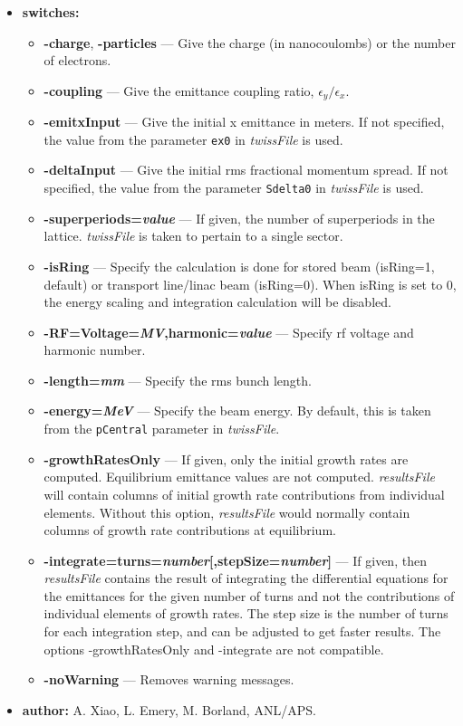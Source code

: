 \documentclass[11pt]{article}
\begin{document}
\begin{itemize}
\item {\bf switches:}
\begin{itemize}
\item {\bf -charge}, {\bf -particles} --- Give the charge (in nanocoulombs) or the
 number of electrons.
\item {\bf -coupling} --- Give the emittance coupling ratio, $\epsilon_y/\epsilon_x$.
\item {\bf -emitxInput} --- Give the initial x emittance in meters.  If not specified,
the value from the parameter \verb|ex0| in {\em twissFile} is used.
\item {\bf -deltaInput} --- Give the initial rms fractional momentum spread.  If not
specified, the value from the parameter \verb|Sdelta0| in {\em twissFile} is used.
\item {\bf -superperiods={\em value}} --- If given, the number of superperiods in the 
lattice.  {\em twissFile} is taken to pertain to a single sector.
\item {\bf -isRing} --- Specify the calculation is done for stored beam 
(isRing=1, default) or transport line/linac beam (isRing=0). When isRing is set to 0, the energy scaling
and integration calculation will be disabled.  
\item {\bf -RF=Voltage={\em MV},harmonic={\em value}} --- Specify rf voltage and harmonic number.
\item {\bf -length={\em mm}} --- Specify the rms bunch length.
\item {\bf -energy={\em MeV}} --- Specify the beam energy.  By default, this is taken from
 the {\tt pCentral} parameter in {\em twissFile}.
\item {\bf -growthRatesOnly} --- If given, only the initial growth rates are computed.  Equilibrium
emittance values are not computed. {\em resultsFile} will contain columns of initial growth rate
contributions from individual elements. Without this option, {\em resultsFile}
would normally contain columns of growth rate contributions at equilibrium.
\item {\bf -integrate=turns={\em number}[,stepSize={\em number}]} --- 
  If given, then {\em resultsFile}
 contains the result of integrating the differential equations for the emittances for 
 the given number of turns and not the contributions 
 of individual elements of growth rates.  
 The step size is the number of turns for each integration step,
 and can be adjusted to get faster results.
 The options -growthRatesOnly and -integrate are not compatible.
\item {\bf -noWarning} --- Removes warning messages.
\end{itemize}

\item {\bf author:} A. Xiao, L. Emery, M. Borland, ANL/APS.
\end{itemize}
\end{document}
